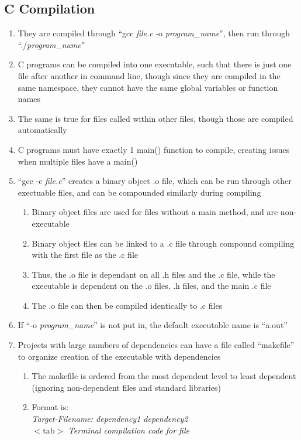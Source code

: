 \documentclass[11 pt, twoside]{article}
\begin{document}
\subsection{C Compilation}
\begin{enumerate}
\item They are compiled through ``gcc \textit{file.c} -o \textit{program\_name}'', then run through ``./\textit{program\_name}''
\item C programs can be compiled into one executable, such that there is just one file after another in command line, though since they are compiled in the same namespace, they cannot have the same global variables or function names
\item The same is true for files called within other files, though those are compiled automatically
\item C programs must have exactly 1 main() function to compile, creating issues when multiple files have a main()
\item ``gcc -c \textit{file.c}'' creates a binary object .o file, which can be run through other exectuable files, and can be compounded similarly during compiling
\begin{enumerate}
\item Binary object files are used for files without a main method, and are non-executable
\item Binary object files can be linked to a .c file through compound compiling with the first file as the .c file
\item Thus, the .o file is dependant on all .h files and the .c file, while the executable is dependent on the .o files, .h files, and the main .c file
\item The .o file can then be compiled identically to .c files
\end{enumerate}
\item If ``-o \textit{program\_name}'' is not put in, the default executable name is ``a.out''
\item Projects with large numbers of dependencies can have a file called ``makefile'' to organize creation of the executable with dependencies
\begin{enumerate}
\item The makefile is ordered from the most dependent level to least dependent (ignoring non-dependent files and standard libraries)
\item Format is: \\ \textit{Target-Filename: dependency1 dependency2}\\ $<$tab$>$ \textit{Terminal compilation code for file}

\end{enumerate}
\end{enumerate}
\end{document}
